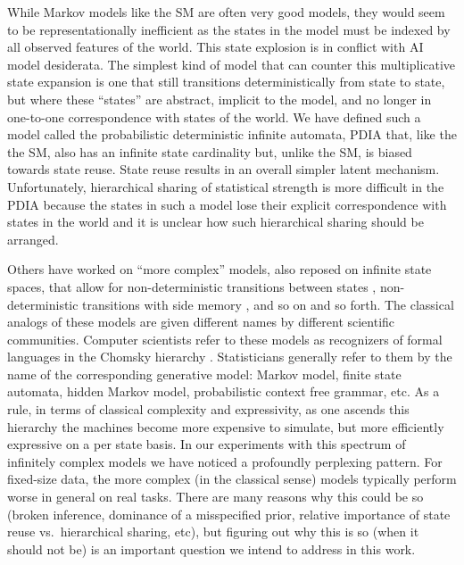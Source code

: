 \documentclass[12pt]{article}
\begin{document}
While Markov models like the SM are often very good models, they would seem to be representationally inefficient as the states in the model must be indexed by all observed features of the world.  %
This state explosion is in conflict with AI model desiderata.  
The simplest kind of model that can counter this multiplicative state expansion is one that still transitions deterministically from state to state, but where these ``states'' are abstract, implicit to the model, and no longer in one-to-one correspondence with states of the world.   We have defined such a model called the probabilistic deterministic infinite automata, PDIA \cite{Pfau2010} that, like the the SM, also has an infinite state cardinality but, unlike the SM, is biased towards state reuse.  State reuse results in an overall simpler latent mechanism.  Unfortunately, hierarchical sharing of statistical strength is more difficult in the PDIA because the states in such a model lose their explicit correspondence with states in the world and it is unclear how such hierarchical sharing should be arranged.

Others have worked on ``more complex'' models, also reposed on infinite state spaces, that allow for non-deterministic transitions between states \cite{Beal2002}, non-deterministic transitions with side memory \cite{Johnson2007}, and so on and so forth.  The classical analogs of these models are given different names by different scientific communities.  Computer scientists refer to these models as recognizers of formal languages in the Chomsky hierarchy \cite{Hopcroft1979}.   Statisticians generally refer to them by the name of the corresponding generative model: Markov model, finite state automata, hidden Markov model, probabilistic context free grammar, etc.  As a rule, in terms of classical complexity and expressivity, as one ascends this hierarchy the machines become more expensive to simulate, but more efficiently expressive on a per state basis.   In our experiments with this spectrum of infinitely complex models we have noticed a profoundly perplexing pattern.  For fixed-size data, the more complex (in the classical sense) models typically perform worse in general on real tasks.  There are many reasons why this could be so (broken inference, dominance of a misspecified prior, relative importance of state reuse vs.~hierarchical sharing, etc), but figuring out why this is so (when it should not be) is an important question we intend to address in this work.
\end{document}
